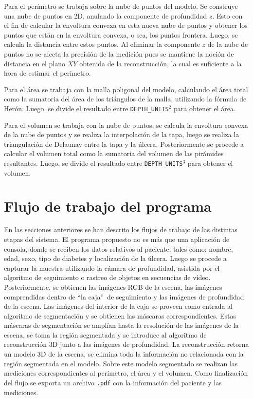 {Para el perímetro se trabaja sobre la nube de puntos del modelo. Se construye una nube de puntos en 2D, anulando la componente de profundidad $z$. Esto con el fin de calcular la envoltura convexa en esta nueva nube de puntos y obtener los puntos que están en la envoltura convexa, o sea, los puntos frontera. Luego, se calcula la distancia entre estos puntos. Al eliminar la componente $z$ de la nube de puntos no se afecta la precisión de la medición pues se mantiene la noción de distancia en el plano $XY$ obtenida de la reconstrucción, la cual es suficiente a la hora de estimar el perímetro.  

Para el área se trabaja con la malla poligonal del modelo, calculando el área total como la sumatoria del área de los triángulos de la malla, utilizando la fórmula de Herón. Luego, se divide el resultado entre \texttt{DEPTH\_UNITS}$^2$ para obtener el área.

Para el volumen se trabaja con la nube de puntos, se calcula la envoltura convexa de la nube de puntos y se realiza la interpolación de la tapa, luego se realiza la triangulación de Delaunay entre la tapa y la úlcera. Posteriormente se procede a calcular el volumen total como la sumatoria del volumen de las pirámides resultantes. Luego, se divide el resultado entre \texttt{DEPTH\_UNITS}$^3$ para obtener el volumen. 


\section{Flujo de trabajo del programa}

En las secciones anteriores se han descrito los flujos de trabajo de las distintas etapas del sistema. El programa propuesto no es más que una aplicación de consola, donde se reciben los datos relativos al paciente, tales como: nombre, edad, sexo, tipo de diabetes y localización de la úlcera. Luego se procede a capturar la muestra utilizando la cámara de profundidad, asistida por el algoritmo de seguimiento o rastreo de objetos en secuencias de vídeo. Posteriormente, se obtienen las imágenes RGB de la escena, las imágenes comprendidas dentro de \textquotedblleft la caja\textquotedblright\ de seguimiento y las imágenes de profundidad de la escena. Las imágenes del interior de la caja se proveen como entrada al algoritmo de segmentación y se obtienen las máscaras correspondientes. Estas máscaras de segmentación se amplían hasta la resolución de las imágenes de la escena, se toma la región segmentada y se introduce al algoritmo de reconstrucción 3D junto a las imágenes de profundidad. La reconstrucción retorna un modelo 3D de la escena, se elimina toda la información no relacionada con la región segmentada en el modelo. Sobre este modelo segmentado se realizan las mediciones correspondientes al perímetro, el área y el volumen. Como finalización del flujo se exporta un archivo \verb|.pdf| con la información del paciente y las mediciones. 

}
